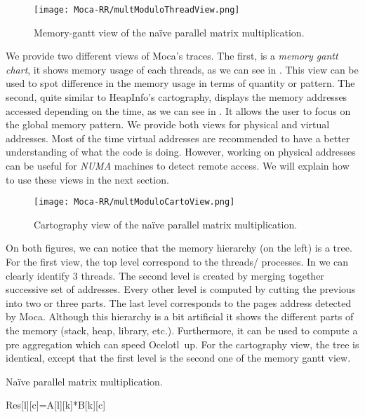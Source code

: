 \begin{figure}[htb]
    \centering
    \texttt{[image: Moca-RR/multModuloThreadView.png]}
    \caption{Memory-gantt view of the naïve parallel matrix multiplication.}
    \label{fig:ocelotl-th0}
\end{figure}


We provide two different views of \gls{Moca}'s traces.
The first, is a \emph{memory gantt chart}, it shows memory usage of each threads, as we can see in .
This view can be used to spot difference in the memory usage in terms of quantity or pattern.
The second, quite similar to HeapInfo's cartography, displays the memory addresses accessed depending on the time, as we can see in .
It allows the user to focus on the global memory pattern.
We provide both views for physical and virtual addresses.
Most of the time virtual addresses are recommended to have a better understanding of what the code is doing.
However, working on physical addresses can be useful for \emph{NUMA} machines to detect remote access.
We will explain how to use these views in the next section.

\begin{figure}[htb]
    \centering
    \texttt{[image: Moca-RR/multModuloCartoView.png]}
    \caption{Cartography view of the naïve parallel matrix multiplication.}
    \label{fig:ocelotl-carto0}
\end{figure}

On both figures, we can notice that the memory hierarchy (on the left) is a tree.
For the first view, the top level correspond to the threads/ processes.
In  we can clearly identify $3$ threads.
The second level is created by merging together successive set of addresses.
Every other level is computed by cutting the previous into two or three parts.
The last level corresponds to the pages address detected by \gls{Moca}.
 Although this hierarchy is a bit artificial it shows the different parts of the memory (stack, heap, library, etc.).
Furthermore, it can be used to compute a pre aggregation which can speed \gls{Ocelotl}~up.
For the cartography view, the tree is identical, except that the first level is the second one of the memory gantt view.

\begin{algorithm}
    \caption{Naïve parallel matrix multiplication.}
    \label{alg:mat-par}
    \begin{algorithmic}
                \State Res[l][c]=A[l][k]*B[k][c]
                \EndFor
            \EndFor
        \EndFor
    \end{algorithmic}
\end{algorithm}

